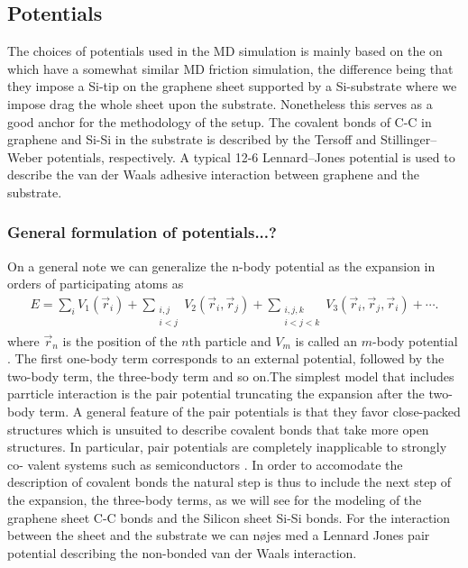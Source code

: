 

\subsection{Potentials}

The choices of potentials used in the MD simulation is mainly based on the on \cite{li_evolving_2016} which have a somewhat similar MD friction simulation, the difference being that they impose a Si-tip on the graphene sheet supported by a Si-substrate where we impose drag the whole sheet upon the substrate. Nonetheless this serves as a good anchor for the methodology of the setup. The covalent bonds of C-C in graphene and Si-Si in the substrate is described by the Tersoff and Stillinger–Weber potentials, respectively. A typical 12-6 Lennard–Jones potential is used to describe the van der Waals adhesive interaction between graphene and the substrate. \\

\subsubsection{General formulation of potentials...?}

On a general note we can generalize the n-body potential as the expansion in orders of participating atoms as 
\begin{align*}
  E = \sum_i V_1(\vec{r}_i) + 
      \sum_{\substack{i, j \\ i < j}} V_2(\vec{r}_i, \vec{r}_j) +  
      \sum_{\substack{i,j,k \\ i < j < k}} V_3(\vec{r}_i, \vec{r}_j, \vec{r}_i) + \cdots.
\end{align*} 
where $\vec{r}_n$ is the position of the $n$th particle and $V_m$ is called an $m$-body potential  \cite{PhysRevB.37.6991}. The first
one-body term corresponds to an external potential, followed by the two-body term, the three-body term and so on.The simplest model that includes parrticle interaction is the pair potential truncating the expansion after the two-body term. A general feature of the pair potentials is that they favor close-packed structures which is unsuited to describe covalent bonds that take more open structures. In particular, pair potentials are completely inapplicable to strongly co- valent systems such as semiconductors \cite{PhysRevB.37.6991}. In order to accomodate the description of covalent bonds the natural step is thus to include the next step of the expansion, the three-body
terms, as we will see for the modeling of the graphene sheet C-C bonds and the Silicon sheet Si-Si bonds. For the interaction between the sheet and the substrate we can nøjes med a Lennard Jones pair potential describing the non-bonded van der Waals interaction.


